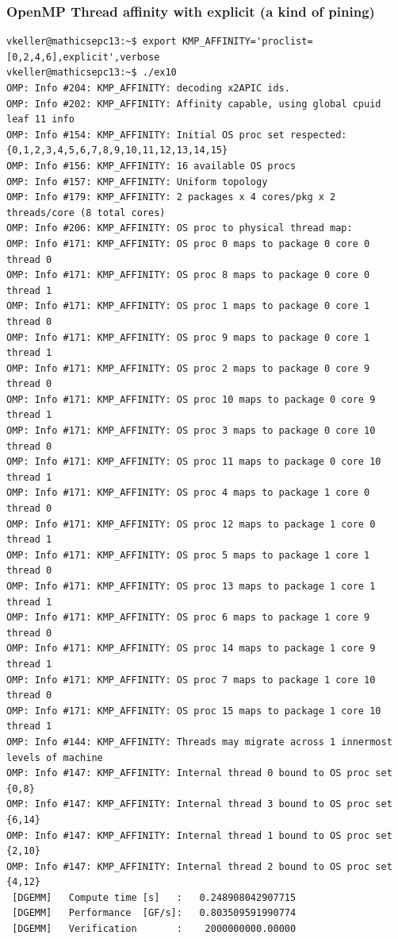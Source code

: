 \begin{frame}[containsverbatim]
\frametitle{OpenMP Thread affinity with explicit (a kind of pining)}
\begingroup
    \fontsize{6pt}{12pt}\linespread{0.5}\selectfont
\begin{verbatim}
vkeller@mathicsepc13:~$ export KMP_AFFINITY='proclist=[0,2,4,6],explicit',verbose
vkeller@mathicsepc13:~$ ./ex10
OMP: Info #204: KMP_AFFINITY: decoding x2APIC ids.
OMP: Info #202: KMP_AFFINITY: Affinity capable, using global cpuid leaf 11 info
OMP: Info #154: KMP_AFFINITY: Initial OS proc set respected: {0,1,2,3,4,5,6,7,8,9,10,11,12,13,14,15}
OMP: Info #156: KMP_AFFINITY: 16 available OS procs
OMP: Info #157: KMP_AFFINITY: Uniform topology
OMP: Info #179: KMP_AFFINITY: 2 packages x 4 cores/pkg x 2 threads/core (8 total cores)
OMP: Info #206: KMP_AFFINITY: OS proc to physical thread map:
OMP: Info #171: KMP_AFFINITY: OS proc 0 maps to package 0 core 0 thread 0
OMP: Info #171: KMP_AFFINITY: OS proc 8 maps to package 0 core 0 thread 1
OMP: Info #171: KMP_AFFINITY: OS proc 1 maps to package 0 core 1 thread 0
OMP: Info #171: KMP_AFFINITY: OS proc 9 maps to package 0 core 1 thread 1
OMP: Info #171: KMP_AFFINITY: OS proc 2 maps to package 0 core 9 thread 0
OMP: Info #171: KMP_AFFINITY: OS proc 10 maps to package 0 core 9 thread 1
OMP: Info #171: KMP_AFFINITY: OS proc 3 maps to package 0 core 10 thread 0
OMP: Info #171: KMP_AFFINITY: OS proc 11 maps to package 0 core 10 thread 1
OMP: Info #171: KMP_AFFINITY: OS proc 4 maps to package 1 core 0 thread 0
OMP: Info #171: KMP_AFFINITY: OS proc 12 maps to package 1 core 0 thread 1
OMP: Info #171: KMP_AFFINITY: OS proc 5 maps to package 1 core 1 thread 0
OMP: Info #171: KMP_AFFINITY: OS proc 13 maps to package 1 core 1 thread 1
OMP: Info #171: KMP_AFFINITY: OS proc 6 maps to package 1 core 9 thread 0
OMP: Info #171: KMP_AFFINITY: OS proc 14 maps to package 1 core 9 thread 1
OMP: Info #171: KMP_AFFINITY: OS proc 7 maps to package 1 core 10 thread 0
OMP: Info #171: KMP_AFFINITY: OS proc 15 maps to package 1 core 10 thread 1
OMP: Info #144: KMP_AFFINITY: Threads may migrate across 1 innermost levels of machine
OMP: Info #147: KMP_AFFINITY: Internal thread 0 bound to OS proc set {0,8}
OMP: Info #147: KMP_AFFINITY: Internal thread 3 bound to OS proc set {6,14}
OMP: Info #147: KMP_AFFINITY: Internal thread 1 bound to OS proc set {2,10}
OMP: Info #147: KMP_AFFINITY: Internal thread 2 bound to OS proc set {4,12}
 [DGEMM]   Compute time [s]   :   0.248908042907715
 [DGEMM]   Performance  [GF/s]:   0.803509591990774
 [DGEMM]   Verification       :    2000000000.00000
\end{verbatim}
\endgroup
\end{frame}






